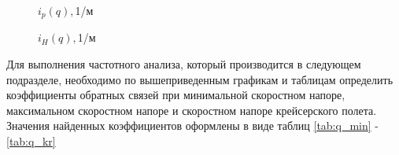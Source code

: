 \begin{figure}[H]
        \caption{$i_p(q), $1/м}
        \label{fig:i_p}
    \end{figure} 

\begin{figure}[H]
        \caption{$i_H(q), $1/м}
        \label{fig:i_H}
    \end{figure} 
    

Для выполнения частотного анализа, который производится в следующем подразделе, необходимо по вышеприведенным графикам и таблицам определить коэффициенты обратных связей при минимальной скоростном напоре, максимальном скоростном напоре и скоростном напоре крейсерского полета. Значения найденных коэффициентов оформлены в виде таблиц \ref{tab:q_min} - \ref{tab:q_kr}


